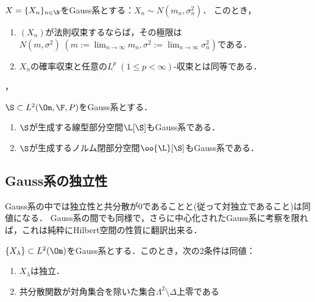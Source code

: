 \documentclass[uplatex,dvipdfmx]{jsreport}
\begin{document}
\begin{theorem}
    $X=\{X_n\}_{n\in\N}$をGauss系とする：$X_n\sim N(m_n,\sigma_n^2)$．
    このとき，
    \begin{enumerate}
        \item $(X_n)$が法則収束するならば，その極限は$N(m,\sigma^2)\;(m:=\lim_{n\to\infty}m_n,\sigma^2:=\lim_{n\to\infty}\sigma_n^2)$である．
        \item $X_n$の確率収束と任意の$L^p\;(1\le p<\infty)$-収束とは同等である．
    \end{enumerate}，
\end{theorem}

\begin{corollary}[線型演算による構成]
    $\S\subset L^2(\Om,\F,P)$をGauss系とする．
    \begin{enumerate}
        \item $\S$が生成する線型部分空間$\L[\S]$もGauss系である．
        \item $\S$が生成するノルム閉部分空間$\oo{\L}[\S]$もGauss系である．
    \end{enumerate}
\end{corollary}

\subsection{Gauss系の独立性}

\begin{tcolorbox}[colframe=ForestGreen, colback=ForestGreen!10!white,breakable,colbacktitle=ForestGreen!40!white,coltitle=black,fonttitle=\bfseries\sffamily,
title=]
    Gauss系の中では独立性と共分散が$0$であることと(従って対独立であること)は同値になる．
    Gauss系の間でも同様で，さらに中心化されたGauss系に考察を限れば，これは純粋にHilbert空間の性質に翻訳出来る．
\end{tcolorbox}

\begin{theorem}[系が独立であることの共分散による特徴付け]
    $\{X_\lambda\}\subset L^2(\Om)$をGauss系とする．このとき，次の2条件は同値：
    \begin{enumerate}
        \item $X_\lambda$は独立．
        \item 共分散関数が対角集合を除いた集合$\Lambda^2\setminus\Delta$上零である
    \end{enumerate}
\end{theorem}
\end{document}
